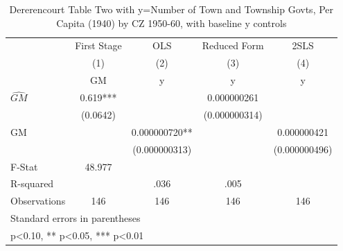 \begin{table}[htbp]\centering
\def\sym#1{\ifmmode^{#1}\else\(^{#1}\)\fi}
\caption{Dererencourt Table Two with y=Number of Town and Township Govts, Per Capita (1940) by CZ 1950-60, with baseline y controls}
\begin{tabular}{l*{4}{c}}
\toprule
                    & First Stage   &         OLS   &Reduced Form   &        2SLS   \\
                    &\multicolumn{1}{c}{(1)}&\multicolumn{1}{c}{(2)}&\multicolumn{1}{c}{(3)}&\multicolumn{1}{c}{(4)}\\
                    &\multicolumn{1}{c}{GM}&\multicolumn{1}{c}{y}&\multicolumn{1}{c}{y}&\multicolumn{1}{c}{y}\\
\midrule
$\hat{GM}$          &       0.619***&               & 0.000000261   &               \\
                    &    (0.0642)   &               &(0.000000314)   &               \\
\addlinespace
GM                  &               & 0.000000720** &               & 0.000000421   \\
                    &               &(0.000000313)   &               &(0.000000496)   \\
\midrule
F-Stat              &      48.977   &               &               &               \\
R-squared           &               &        .036   &        .005   &               \\
Observations        &         146   &         146   &         146   &         146   \\
\bottomrule
\multicolumn{5}{l}{\footnotesize Standard errors in parentheses}\\
\multicolumn{5}{l}{\footnotesize * p<0.10, ** p<0.05, *** p<0.01}\\
\end{tabular}
\end{table}
